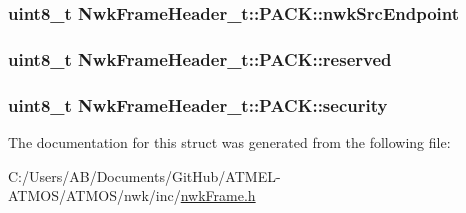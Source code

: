 \hypertarget{struct_nwk_frame_header__t_1_1_p_a_c_k_a5aef4ba0418253c9cd3873808dac10a1}{
\subsubsection[{nwk\-Src\-Endpoint}]{\setlength{\rightskip}{0pt plus 5cm}uint8\-\_\-t Nwk\-Frame\-Header\-\_\-t\-::\-P\-A\-C\-K\-::nwk\-Src\-Endpoint}}\label{struct_nwk_frame_header__t_1_1_p_a_c_k_a5aef4ba0418253c9cd3873808dac10a1}
\hypertarget{struct_nwk_frame_header__t_1_1_p_a_c_k_aba208be46817d5bbc1bd29b970937249}{
\subsubsection[{reserved}]{\setlength{\rightskip}{0pt plus 5cm}uint8\-\_\-t Nwk\-Frame\-Header\-\_\-t\-::\-P\-A\-C\-K\-::reserved}}\label{struct_nwk_frame_header__t_1_1_p_a_c_k_aba208be46817d5bbc1bd29b970937249}
\hypertarget{struct_nwk_frame_header__t_1_1_p_a_c_k_a0aa61ebeebfc3250134ff22b50ce8e0c}{
\subsubsection[{security}]{\setlength{\rightskip}{0pt plus 5cm}uint8\-\_\-t Nwk\-Frame\-Header\-\_\-t\-::\-P\-A\-C\-K\-::security}}\label{struct_nwk_frame_header__t_1_1_p_a_c_k_a0aa61ebeebfc3250134ff22b50ce8e0c}


The documentation for this struct was generated from the following file\-:\begin{DoxyCompactItemize}
\item 
C\-:/\-Users/\-A\-B/\-Documents/\-Git\-Hub/\-A\-T\-M\-E\-L-\/\-A\-T\-M\-O\-S/\-A\-T\-M\-O\-S/nwk/inc/\hyperlink{nwk_frame_8h}{nwk\-Frame.\-h}\end{DoxyCompactItemize}
